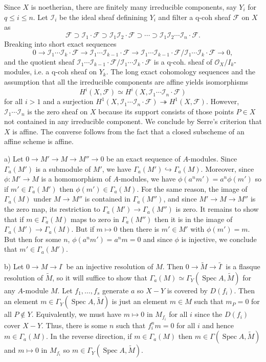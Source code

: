 \documentclass{report}
\newcommand{\I}{\mathscr{I}}
\newcommand{\F}{\mathcal{F}}
\renewcommand{\O}{\mathcal{O}}
\DeclareMathOperator{\Spec}{Spec}
\begin{document}
\bigskip
{}	Since $X$ is noetherian, there are finitely many irreducible components, say $Y_i$ for $q\le i\le n$.
Let $\I_i$ be the ideal sheaf definining $Y_i$ and filter a q-coh sheaf $\F$ on $X$ as
$$\F\supset \I_1\cdot\F\supset \I_1\I_2\cdot \F\supset\cdots\supset \I_1\I_2\cdots\I_n\cdot \F.$$
Breaking into short exact sequences 
$$0\rightarrow \I_1\cdots\I_k\cdot\F\rightarrow \I_1\cdots\I_{k-1}\cdot \F\rightarrow \I_1\cdots\I_{k-1}\cdot\F/\I_1\cdots\I_{k}\cdot\F\rightarrow 0,$$
and the quotient sheaf $\I_1\cdots\I_{k-1}\cdot\F/\I_1\cdots\I_{k}\cdot\F$ is a q-coh. sheaf of $\O_X/I_k$-modules, i.e.
a q-coh sheaf on $Y_k$.  The long exact cohomology sequences and the assumption that all the irreducible components are affine
yields isomorphisms
$$H^i(X,\F)\simeq H^i(X,\I_1\cdots\I_n\cdot\F)$$
for all $i>1$ and a surjection $H^1(X,\I_1\cdots\I_n\cdot\F)\twoheadrightarrow H^1(X,\F)$.
However, $\I_1\cdots\I_n$ is the zero sheaf on $X$ because its support consists of those points $P\in X$
not contained in any irreducible component.  We conclude by Serre's criterion that $X$ is affine.
The converse follows from the fact that a closed subscheme of an affine scheme is affine.

\bigskip
{}	a)  Let $0\rightarrow M'\rightarrow M\rightarrow M''\rightarrow 0$ be an exact sequence of $A$-modules.
Since $\Gamma_a(M')$ is a submodule of $M'$, we have $\Gamma_a(M')\hookrightarrow \Gamma_a(M)$.
Moreover, since $\phi:M'\rightarrow M$ is a homomorphism of $A$-modules, we have $\phi(a^nm')=a^n\phi(m')$
so if $m'\in \Gamma_a(M')$ then $\phi(m')\in\Gamma_a(M)$.  For the same reason, the image
of $\Gamma_a(M)$ under $M\rightarrow M''$ is contained in $\Gamma_a(M'')$, and since
$M'\rightarrow M\rightarrow M''$ is the zero map, its restriction to $\Gamma_a(M')\rightarrow\Gamma_a(M'')$
is zero.  It remains to show that if $m\in\Gamma_a(M)$ maps to zero in $\Gamma_a(M'')$ then it is
in the image of $\Gamma_a(M')\rightarrow \Gamma_a(M)$.	But if $m\mapsto 0$ then there is
$m'\in M'$ with $\phi(m')= m$.  But then for some $n$, $\phi(a^n m')=a^nm=0$ and since $\phi$
is injective, we conclude that $m'\in \Gamma_a(M')$.  

\noindent
b)	Let $0\rightarrow M\rightarrow I^{\cdot}$ be an injective resolution of $M$.
Then $0\rightarrow\widetilde{M}\rightarrow\widetilde{I^{\cdot}}$ is a flasque resolution of $\widetilde{M}$,
so it will suffice to show that $\Gamma_a(M)\simeq \Gamma_Y(\Spec A,\widetilde{M})$ for any $A$-module
$M$.		Let $f_1,\ldots,f_s$ generate $a$ so $X-Y$ is covered by $D(f_i)$.  Then an element
 $m\in \Gamma_Y(\Spec A,\widetilde{M})$ is just an element $m\in M$ such that $m_P=0$ for all $P\not\in Y$.
 Equivalently, we must have $m\mapsto 0$ in $M_{f_i}$ for all $i$ since the $D(f_i)$ cover $X-Y$.  Thus, there
 is some $n$ such that $f_i^n m=0$ for all $i$ and hence $m\in \Gamma_a(M)$.  In the reverse direction,
 if $m\in \Gamma_a(M)$ then $m\in \Gamma(\Spec A,\widetilde{M})$ and $m\mapsto 0$ in $M_{f_i}$
 so $m\in \Gamma_Y(\Spec A,\widetilde{M})$.
\end{document}
